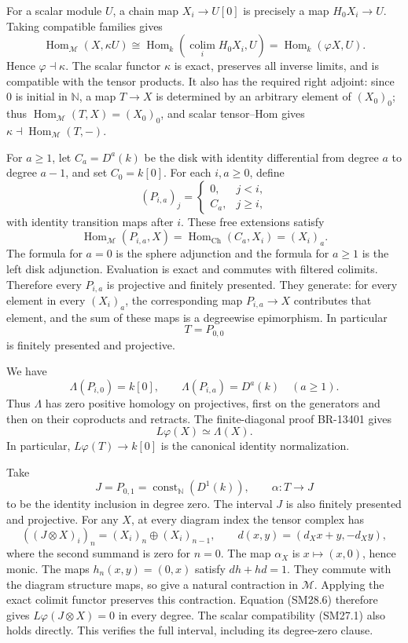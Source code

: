 \documentclass[11pt,a4paper]{article}
\theoremstyle{definition}\newtheorem{definition}[theorem]{Definition}
\theoremstyle{remark}\newtheorem{remark}[theorem]{Remark}
\begin{document}
For a scalar module \(U\), a chain map \(X_i\to U[0]\) is precisely
a map \(H_0X_i\to U\).  Taking compatible families gives
\[
 \operatorname{Hom}_{\mathcal M}(X,\kappa U)
   \cong\operatorname{Hom}_k
       \left(\operatorname*{colim}_{i}H_0X_i,U\right)
   =\operatorname{Hom}_k(\varphi X,U).
 \tag{SM28.3}
\]
Hence \(\varphi\dashv\kappa\).
The scalar functor \(\kappa\) is exact, preserves all inverse limits,
and is compatible with the tensor products.  It also has the required
right adjoint: since \(0\) is initial in \(\mathbb N\), a map
\(T\to X\) is determined by an arbitrary element of \((X_0)_0\);
thus \(\operatorname{Hom}_{\mathcal M}(T,X)=(X_0)_0\), and
scalar tensor--Hom gives \(\kappa\dashv\operatorname{Hom}_{\mathcal M}(T,-)\).

For \(a\ge1\), let \(C_a=D^a(k)\) be the disk with identity
differential from degree \(a\) to degree \(a-1\), and set
\(C_0=k[0]\).  For each \(i,a\ge0\), define
\[
 (P_{i,a})_j=
 \begin{cases}0,&j<i,\\ C_a,&j\ge i,\end{cases}
 \tag{SM28.4}
\]
with identity transition maps after \(i\).  These free extensions
satisfy
\[
 \operatorname{Hom}_{\mathcal M}(P_{i,a},X)
   =\operatorname{Hom}_{\mathrm{Ch}}(C_a,X_i)
   =(X_i)_a.
 \tag{SM28.5}
\]
The formula for \(a=0\) is the sphere adjunction and the formula for
\(a\ge1\) is the left disk adjunction.  Evaluation is exact and
commutes with filtered colimits.  Therefore every \(P_{i,a}\) is
projective and finitely presented.  They generate: for every element
in every \((X_i)_a\), the corresponding map \(P_{i,a}\to X\) contributes
that element, and the sum of these maps is a degreewise epimorphism.
In particular
\[
 T=P_{0,0}
\]
is finitely presented and projective.

We have
\[
 \Lambda(P_{i,0})=k[0],\qquad
 \Lambda(P_{i,a})=D^a(k)\quad(a\ge1).
\]
Thus \(\Lambda\) has zero positive homology on projectives, first on
the generators and then on their coproducts and retracts.
The finite-diagonal proof BR-13401 gives
\[
 L\varphi(X)\simeq\Lambda(X).
 \tag{SM28.6}
\]
In particular, \(L\varphi(T)\to k[0]\) is the canonical identity
normalization.

Take
\[
 J=P_{0,1}=\operatorname{const}_{\mathbb N}(D^1(k)),
 \qquad
 \alpha:T\longrightarrow J
\]
to be the identity inclusion in degree zero.  The interval \(J\)
is also finitely presented and projective.
For any \(X\), at every diagram index the tensor complex has
\[
 ((J\otimes X)_i)_n=(X_i)_n\oplus(X_i)_{n-1},\qquad
 d(x,y)=(d_Xx+y,-d_Xy),
 \tag{SM28.7}
\]
where the second summand is zero for \(n=0\).
The map \(\alpha_X\) is \(x\mapsto(x,0)\), hence monic.
The maps \(h_n(x,y)=(0,x)\) satisfy \(dh+hd=1\).
They commute with the diagram structure maps, so give a natural
contraction in \(\mathcal M\).  Applying the exact colimit functor
preserves this contraction.  Equation (SM28.6) therefore gives
\(L\varphi(J\otimes X)=0\) in every degree.
The scalar compatibility (SM27.1) also holds directly.
This verifies the full interval, including its degree-zero clause.
\end{document}
